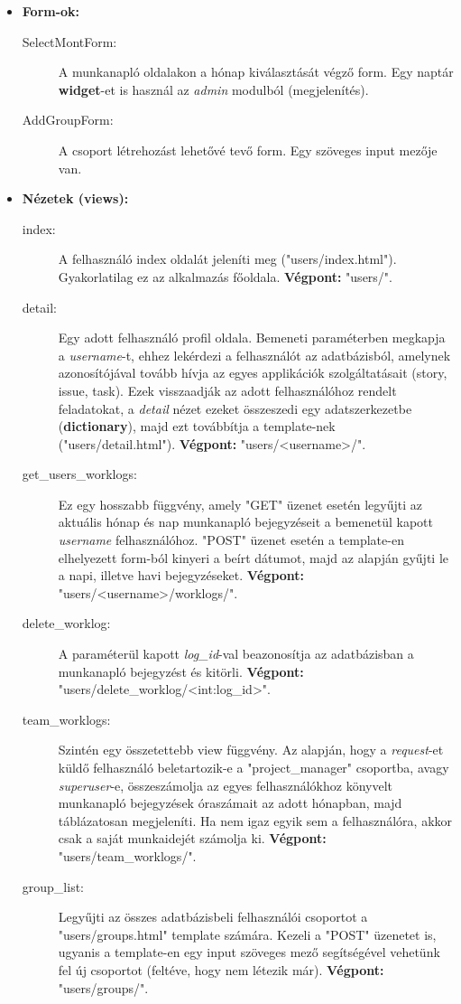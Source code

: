\begin{itemize}
	\item \textbf{Form-ok:}
	\begin{description}
		\item[SelectMontForm:] A munkanapló oldalakon a hónap kiválasztását végző form. Egy naptár \textbf{widget}-et is használ az \textit{admin} modulból (megjelenítés).
		\item[AddGroupForm:] A csoport létrehozást lehetővé tevő form. Egy szöveges input mezője van.
	\end{description}
	\item \textbf{Nézetek (views):}
	\begin{description}
		\item[index:] A felhasználó index oldalát jeleníti meg ("users/index.html"). Gyakorlatilag ez az alkalmazás főoldala. \textbf{Végpont:} "users/".
		\item[detail:] Egy adott felhasználó profil oldala. Bemeneti paraméterben megkapja a \textit{username}-t, ehhez lekérdezi a felhasználót az adatbázisból, amelynek azonosítójával tovább hívja az egyes applikációk szolgáltatásait (story, issue, task). Ezek visszaadják az adott felhasználóhoz rendelt feladatokat, a \textit{detail} nézet ezeket összeszedi egy adatszerkezetbe (\textbf{dictionary}), majd ezt továbbítja a template-nek ("users/detail.html"). \textbf{Végpont:} "users/<username>/".
		\item[get\_users\_worklogs:] Ez egy hosszabb függvény, amely "GET" üzenet esetén legyűjti az aktuális hónap és nap munkanapló bejegyzéseit a bemenetül kapott \textit{username} felhasználóhoz. "POST" üzenet esetén a template-en elhelyezett form-ból kinyeri a beírt dátumot, majd az alapján gyűjti le a napi, illetve havi bejegyzéseket. \textbf{Végpont:} "users/<username>/worklogs/".
		\item[delete\_worklog:] A paraméterül kapott \textit{log\_id}-val beazonosítja az adatbázisban a munkanapló bejegyzést és kitörli. \textbf{Végpont:} "users/delete\_worklog/<int:log\_id>".
		\item[team\_worklogs:] Szintén egy összetettebb view függvény. Az alapján, hogy a \textit{request}-et küldő felhasználó beletartozik-e a "project\_manager"  csoportba, avagy \textit{superuser}-e, összeszámolja az egyes felhasználókhoz könyvelt munkanapló bejegyzések óraszámait az adott hónapban, majd táblázatosan megjeleníti. Ha nem igaz egyik sem a felhasználóra, akkor csak a saját munkaidejét számolja ki. \textbf{Végpont:} "users/team\_worklogs/".
		\item[group\_list:] Legyűjti az összes adatbázisbeli felhasználói csoportot a "users/groups.html" template számára. Kezeli a "POST" üzenetet is, ugyanis a template-en egy input szöveges mező segítségével vehetünk fel új csoportot (feltéve, hogy nem létezik már). \textbf{Végpont:} "users/groups/".

\end{description}
\end{itemize}
